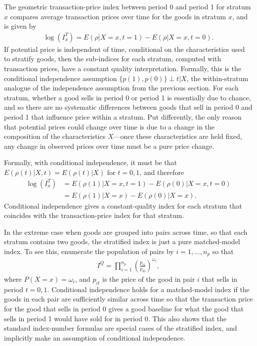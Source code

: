 \documentclass[
]{article}
\begin{document}
The geometric transaction-price index between period 0 and period 1 for stratum \(x\) compares average transaction prices over time for the goods in stratum \(x\), and is given by
\begin{align*}
\log(I^{T}_{x}) = E(\rho | X = x, t = 1) - E(\rho | X = x, t = 0).
\end{align*}
If potential price is independent of time, conditional on the characteristics used to stratify goods, then the sub-indices for each stratum, computed with transaction prices, have a constant quality interpretation. Formally, this is the conditional independence assumption \(\{p(1), p(0)\} \perp t | X\), the within-stratum analogue of the independence assumption from the previous section. For each stratum, whether a good sells in period 0 or period 1 is essentially due to chance, and so there are no systematic differences between goods that sell in period 0 and period 1 that influence price within a stratum. Put differently, the only reason that potential prices could change over time is due to a change in the composition of the characteristics \(X\)---once these characteristics are held fixed, any change in observed prices over time must be a pure price change.

Formally, with conditional independence, it must be that \(E(\rho(t) | X, t) = E(\rho(t) | X)\) for \(t = 0,1\), and therefore
\begin{align*}
\log(I^{T}_{x}) &= E(\rho(1) | X = x, t = 1) - E(\rho(0) | X = x, t = 0) \\
 &= E(\rho(1) | X = x) - E(\rho(0) | X = x).
\end{align*}
Conditional independence gives a constant-quality index for each stratum that coincides with the transaction-price index for that stratum.

In the extreme case when goods are grouped into pairs across time, so that each stratum contains two goods, the stratified index is just a pure matched-model index. To see this, enumerate the population of pairs by \(i = 1,\ldots, n_{p}\) so that
\begin{align*}
I^{Q} = \prod_{i = 1}^{n_{p}} \left(\frac{p_{i1}}{p_{i0}}\right)^{\omega_{i}},
\end{align*}
where \(P(X = x) = \omega_{i}\), and \(p_{it}\) is the price of the good in pair \(i\) that sells in period \(t = 0,1\). Conditional independence holds for a matched-model index if the goods in each pair are sufficiently similar across time so that the transaction price for the good that sells in period 0 gives a good baseline for what the good that sells in period 1 would have sold for in period 0. This also shows that the standard index-number formulas are special cases of the stratified index, and implicitly make an assumption of conditional independence.
\end{document}
